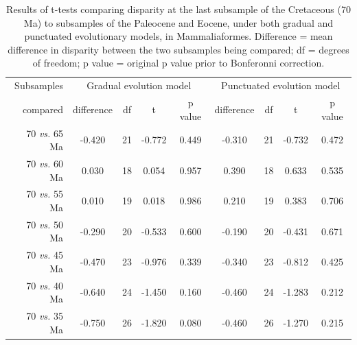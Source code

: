 \documentclass[12pt,letterpaper]{article}
\begin{document}
\begin{table}[ht]
\caption{Results of t-tests comparing disparity at the last subsample of the Cretaceous (70 Ma) to subsamples of the Paleocene and Eocene, under both gradual and punctuated evolutionary models, in Mammaliaformes. Difference = mean difference in disparity between the two subsamples being compared; df = degrees of freedom; p value = original p value prior to Bonferonni correction. }
\label{tab:Tab_slater}
\centering
\begin{tabular}{r|cccc|cccc}
  \hline
  Subsamples & \multicolumn{4}{c|}{Gradual evolution model} & \multicolumn{4}{c}{Punctuated evolution model} \\
  compared & difference & df & t & p value & difference & df & t & p value \\ 
  \hline
  70 \textit{vs.} 65 Ma & -0.420 & 21 & -0.772 & 0.449 & -0.310 & 21 & -0.732 & 0.472 \\ 
  70 \textit{vs.} 60 Ma & 0.030 & 18 & 0.054 & 0.957 & 0.390 & 18 & 0.633 & 0.535 \\ 
  70 \textit{vs.} 55 Ma & 0.010 & 19 & 0.018 & 0.986 & 0.210 & 19 & 0.383 & 0.706 \\ 
  70 \textit{vs.} 50 Ma & -0.290 & 20 & -0.533 & 0.600 & -0.190 & 20 & -0.431 & 0.671 \\ 
  70 \textit{vs.} 45 Ma & -0.470 & 23 & -0.976 & 0.339 & -0.340 & 23 & -0.812 & 0.425 \\ 
  70 \textit{vs.} 40 Ma & -0.640 & 24 & -1.450 & 0.160 & -0.460 & 24 & -1.283 & 0.212 \\ 
  70 \textit{vs.} 35 Ma & -0.750 & 26 & -1.820 & 0.080 & -0.460 & 26 & -1.270 & 0.215 \\ 
   \hline
\end{tabular}
\end{table}


\end{document}
